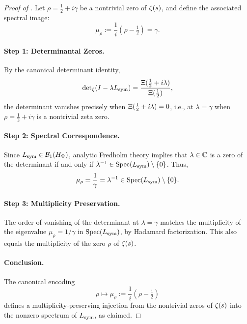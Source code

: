 \begin{proof}[Proof of ]
Let \( \rho = \tfrac{1}{2} + i\gamma \) be a nontrivial zero of \( \zeta(s) \), and define the associated spectral image:
\[
\mu_\rho := \frac{1}{i}(\rho - \tfrac{1}{2}) = \gamma.
\]

\paragraph{Step 1: Determinantal Zeros.}
By the canonical determinant identity,
\[
\det\nolimits_\zeta(I - \lambda L_{\mathrm{sym}}) = \frac{\Xi(\tfrac{1}{2} + i\lambda)}{\Xi(\tfrac{1}{2})},
\]
the determinant vanishes precisely when \( \Xi(\tfrac{1}{2} + i\lambda) = 0 \), i.e., at \( \lambda = \gamma \) when \( \rho = \tfrac{1}{2} + i\gamma \) is a nontrivial zeta zero.

\paragraph{Step 2: Spectral Correspondence.}
Since \( L_{\mathrm{sym}} \in \mathcal{B}_1(H_{\Psi}) \), analytic Fredholm theory implies that \( \lambda \in \mathbb{C} \) is a zero of the determinant if and only if \( \lambda^{-1} \in \operatorname{Spec}(L_{\mathrm{sym}}) \setminus \{0\} \). Thus,
\[
\mu_\rho = \frac{1}{\gamma} = \lambda^{-1} \in \operatorname{Spec}(L_{\mathrm{sym}}) \setminus \{0\}.
\]

\paragraph{Step 3: Multiplicity Preservation.}
The order of vanishing of the determinant at \( \lambda = \gamma \) matches the multiplicity of the eigenvalue \( \mu_\rho = 1/\gamma \) in \( \operatorname{Spec}(L_{\mathrm{sym}}) \), by Hadamard factorization. This also equals the multiplicity of the zero \( \rho \) of \( \zeta(s) \).

\paragraph{Conclusion.}
The canonical encoding
\[
\rho \mapsto \mu_\rho := \frac{1}{i}(\rho - \tfrac{1}{2})
\]
defines a multiplicity-preserving injection from the nontrivial zeros of \( \zeta(s) \) into the nonzero spectrum of \( L_{\mathrm{sym}} \), as claimed.
\end{proof}
